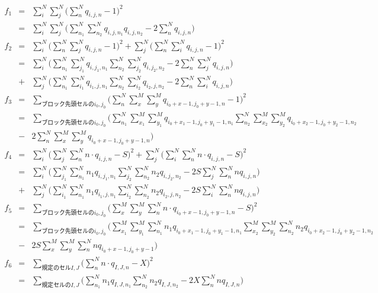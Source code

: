 \documentclass[uplatex,dvipdfmx,a4paper,11pt,oneside,openany]{jsbook}
\begin{document}
\begin{eqnarray*}
  f_1 &=& \sum_i^N\sum_j^N\bigg(\sum_n^N q_{i,j,n} - 1\bigg)^2\\
&=& \sum_i^N\sum_j^N\bigg(\sum_{n_1}^N\sum_{n_2}^N q_{i,j,n_1}q_{i,j,n_2} -2\sum_n^N q_{i,j,n} \bigg)\\
f_2 &=& \sum_i^N\bigg(\sum_n^N\sum_j^N q_{i,j,n} - 1\bigg)^2 + \sum_j^N\bigg(\sum_n^N\sum_i^N q_{i,j,n} - 1\bigg)^2\\
&=& \sum_i^N\bigg(\sum_{n_1}^N\sum_{j_1}^Nq_{i,j_1,n_1}\sum_{n_2}^N\sum_{j_2}^Nq_{i,j_2,n_2} - 2\sum_n^N\sum_j^N q_{i,j,n}\bigg)\\
 &+& \sum_j^N\bigg(\sum_{n_1}^N\sum_{i_1}^Nq_{i_1,j,n_1}\sum_{n_2}^N\sum_{i_2}^Nq_{i_2,j,n_2} - 2\sum_n^N\sum_i^N q_{i,j,n}\bigg)\\
 f_3 &=& \sum_{ブロック先頭セルのi_0,j_0}\bigg(\sum_n^N\sum_x^M\sum_y^M q_{i_0+x-1,j_0+y-1,n} - 1\bigg)^2\\
 &=& \sum_{ブロック先頭セルのi_0,j_0}\bigg(\sum_{n_1}^N\sum_{x_1}^M\sum_{y_1}^M q_{i_0+x_1-1,j_0
 +y_1-1,n_1} \sum_{n_2}^N\sum_{x_2}^M\sum_{y_2}^M q_{i_0+x_2-1,j_0
 +y_2-1,n_2}\\
  &-& 2\sum_n^N\sum_x^M\sum_y^M q_{i_0+x-1,j_0+y-1,n}\bigg)\\
 f_4 &=& \sum_i^N\bigg(\sum_j^N\sum_n^N n \cdot q_{i,j,n} - S\bigg)^2 + \sum_j^N\bigg(\sum_i^N\sum_n^N n \cdot q_{i,j,n} - S\bigg)^2\\
 &=& \sum_i^N\bigg(\sum_{j_1}^N\sum_{n_1}^N n_1 q_{i,j_1,n_1}\sum_{j_2}^N\sum_{n_2}^N n_2 q_{i,j_2,n_2} -2S\sum_j^N\sum_n^N n q_{i,j,n}\bigg)\\
 &+& \sum_j^N\bigg(\sum_{i_1}^N\sum_{n_1}^N n_1 q_{i_1,j,n_1}\sum_{i_2}^N\sum_{n_2}^N n_2 q_{i_2,j,n_2} -2S\sum_i^N\sum_n^N n q_{i,j,n}\bigg)\\
 f_5 &=& \sum_{ブロック先頭セルのi_0,j_0}\bigg(\sum_x^M\sum_y^M\sum_n^N n \cdot q_{i_0+x-1,j_0+y-1,n} - S\bigg)^2\\
 &=& \sum_{ブロック先頭セルのi_0,j_0}\bigg(\sum_{x_1}^M\sum_{y_1}^M\sum_{n_1}^N n_1 q_{i_0+x_1-1,j_0+y_1-1,n_1}\sum_{x_2}^M\sum_{y_2}^M\sum_{n_2}^N n_2 q_{i_0+x_2-1,j_0+y_2-1,n_2}\\
  &-& 2S\sum_x^M\sum_y^M\sum_n^N n q_{i_0+x-1,j_0+y-1}\bigg)\\
 f_6 &=& \sum_{規定のセルI,J}\bigg(\sum_n^N n \cdot q_{I,J,n} - X\bigg)^2\\
 &=& \sum_{規定セルのI,J}\bigg(\sum_{n_1}^N n_1 q_{I,J,n_1}\sum_{n_2}^N n_2 q_{I,J,n_2} - 2X\sum_n^N n q_{I,J,n}\bigg)
\end{eqnarray*}
\end{document}
